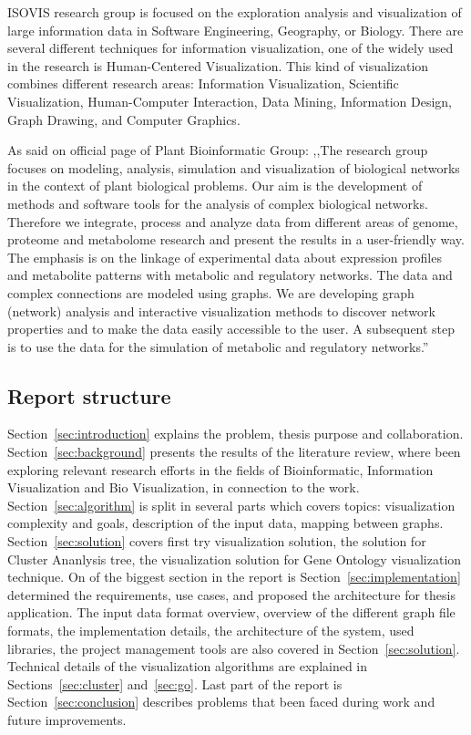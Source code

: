 ISOVIS research group is focused on the exploration analysis and visualization of large information data in Software Engineering, Geography, or Biology. There are several different techniques for information visualization, one of the widely used in the research is Human-Centered Visualization. This kind of visualization combines different research areas: Information Visualization, Scientific Visualization, Human-Computer Interaction, Data Mining, Information Design, Graph Drawing, and Computer Graphics.


As said on official page of Plant Bioinformatic Group: ,,The research group focuses on modeling, analysis, simulation and visualization of biological networks in the context of plant biological problems. Our aim is the development of methods and software tools for the analysis of complex biological networks. Therefore we integrate, process and analyze data from different areas of genome, proteome and
metabolome research and present the results in a user-friendly way. The emphasis is on the linkage of experimental data about expression profiles and metabolite patterns with metabolic and regulatory networks. The data and complex connections are modeled using graphs. We are developing graph (network) analysis and interactive visualization methods to discover network properties and to make the data easily accessible to the user. A subsequent step is to use the data for the simulation of metabolic and regulatory networks.''~\cite{PBG}


\subsection{Report structure}
\label{sec:structure}

Section~\ref{sec:introduction} explains the problem, thesis purpose and collaboration. Section~\ref{sec:background} presents the results of the literature review, where been exploring relevant research efforts in the fields of Bioinformatic, Information Visualization and Bio Visualization, in connection to the work. Section~\ref{sec:algorithm} is split in several parts which covers topics: visualization complexity and goals, description of the input data, mapping between graphs. Section~\ref{sec:solution} covers first try visualization solution, the solution for Cluster Ananlysis tree, the visualization solution for Gene Ontology visualization technique. On of the biggest section in the report is Section~\ref{sec:implementation} determined the requirements, use cases, and proposed the architecture for thesis application. The input data format overview, overview of the different graph file formats, the implementation details, the architecture of the system, used libraries, the project management tools are also covered in Section~\ref{sec:solution}. Technical details of the visualization algorithms are explained in Sections~\ref{sec:cluster} and~\ref{sec:go}. Last part of the report is Section~\ref{sec:conclusion} describes problems that been faced during work and future improvements.

